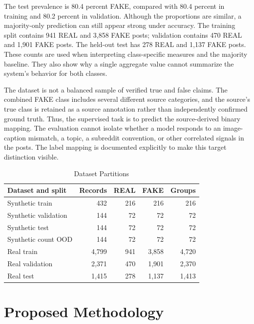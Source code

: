 \documentclass[conference]{IEEEtran}
\begin{document}
The test prevalence is 80.4 percent FAKE, compared with 80.4 percent in training and 80.2 percent in validation. Although the proportions are similar, a majority-only prediction can still appear strong under accuracy. The training split contains 941 REAL and 3,858 FAKE posts; validation contains 470 REAL and 1,901 FAKE posts. The held-out test has 278 REAL and 1,137 FAKE posts. These counts are used when interpreting class-specific measures and the majority baseline. They also show why a single aggregate value cannot summarize the system's behavior for both classes.

The dataset is not a balanced sample of verified true and false claims. The combined FAKE class includes several different source categories, and the source's true class is retained as a source annotation rather than independently confirmed ground truth. Thus, the supervised task is to predict the source-derived binary mapping. The evaluation cannot isolate whether a model responds to an image-caption mismatch, a topic, a subreddit convention, or other correlated signals in the posts. The label mapping is documented explicitly to make this target distinction visible.
\begin{table}[t]
\caption{Dataset Partitions}\label{tab:splits}\centering\footnotesize
\begin{tabular}{lrrrr}
\hline Dataset and split & Records & REAL & FAKE & Groups\\\hline
Synthetic train & 432 & 216 & 216 & 216\\
Synthetic validation & 144 & 72 & 72 & 72\\
Synthetic test & 144 & 72 & 72 & 72\\
Synthetic count OOD & 144 & 72 & 72 & 72\\
Real train & 4,799 & 941 & 3,858 & 4,720\\
Real validation & 2,371 & 470 & 1,901 & 2,370\\
Real test & 1,415 & 278 & 1,137 & 1,413\\\hline
\end{tabular}
\end{table}
\section{Proposed Methodology}
\end{document}
